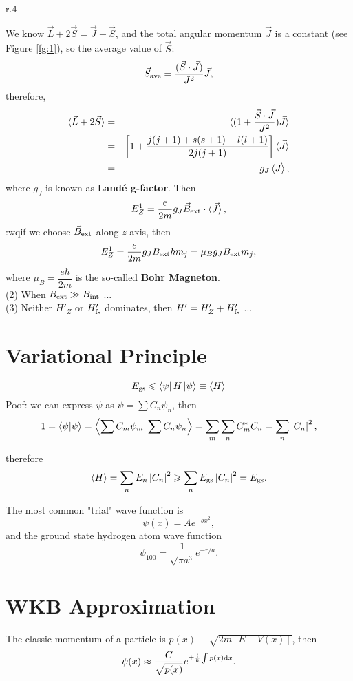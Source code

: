 \documentclass[12pt, 
]{article}
\begin{document}
\begin{wrapfigure}{r}{.4\textwidth}
\hspace{0.8cm}
\caption{$\vec{J}=\vec{L}+\vec{S}$ is a constant.}
\label{fg:1}
\end{wrapfigure}

We know $\vec{L}+2\vec{S}=\vec{J}+\vec{S}$, and the total angular momentum $\vec{J}$ is a constant (see Figure \ref{fg:1}), so the average value of $\vec{S}$:
\[
	\vec{S}_{\rm ave}=\frac{(\vec{S}\cdot\vec{J})}{J^2}\vec{J},
\]
therefore,
\begin{eqnarray*}
	\braket{\vec{L}+2\vec{S}}&=&\braket{(1+\frac{\vec{S}\cdot\vec{J}}{J^2})\vec{J}}\\
	&=&\left[1+\frac{j(j+1)+s(s+1)-l(l+1)}{2j(j+1)}\right]\braket{\vec{J}}\\
	&=&g_J\braket{\vec{J}},
\end{eqnarray*}
where $g_J$ is known as {\bf Land\'{e} g-factor}.
Then
\[
	E^1_Z=\frac{e}{2m}g_J\vec{B}_{\rm ext}\cdot\braket{\vec{J}},
\]
:wqif we choose $\vec{B}_{\rm ext}$ along $z$-axis, then
\[
	E_Z^1=\frac{e}{2m}g_JB_{\rm ext}\hbar m_j=\mu_B g_JB_{\rm ext}m_j,
\]
where $\mu_B=\dfrac{e\hbar}{2m}$ is the so-called {\bf Bohr Magneton}.\\

\noindent (2) When $B_{\rm ext}\gg B_{\rm int}$ ...\\

\noindent (3) Neither $H'_Z$ or $H'_{\rm fs}$ dominates, then $H'=H'_Z+H'_{\rm fs}$ ...
\newpage

\section{Variational Principle}
\[	
	E_{\rm gs}\leqslant\bra{\psi}H\ket{\psi}\equiv\braket{H}
\]
Poof: we can express $\psi$ as $\psi=\sum C_n\psi_n$, then
\[
	1=\braket{\psi|\psi}=\left<\sum C_m\psi_m|\sum C_n\psi_n\right>=\sum_m\sum_n C_m^*C_n=\sum_n\left|C_n\right|^2,
\]

therefore
\[
	\braket{H}=\sum_nE_n\left|C_n\right|^2\geqslant\sum_nE_{\rm gs}\left|C_n\right|^2=E_{\rm gs}.
\]

The most common "trial" wave function is
\[
	\psi(x)=Ae^{-bx^2},
\]
and the ground state hydrogen atom wave function
\[
	\psi_{100}=\frac{1}{\sqrt{\pi a^3}}e^{-r/a}.
\]

\section{WKB Approximation}
The classic momentum of a particle is $p(x)\equiv\sqrt{2m[E-V(x)]}$, then
\[
	\psi(x)\approx\frac{C}{\sqrt{p(x)}}e^{\pm\frac{i}{\hbar}\int p(x){\rm d}x}.
\]
\end{document}
